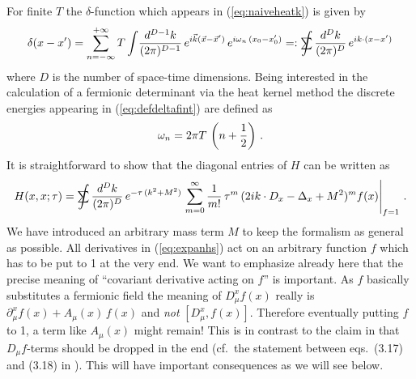 \documentclass[a4paper,showpacs,showkeys,prd,nofootinbib]{revtex4}
\newcommand{\sumint}{\hbox{$\sum$}\!\!\!\!\!\!\!\int }
\begin{document}
For finite $T$ the $\delta$-function which appears in (\ref{eq:naiveheatk}) is given
by
\begin{equation}
  \label{eq:defdeltafint}
\delta(x-x') = \sum\limits_{n = -\infty}^{+\infty} 
T \int\! {d^{D-1}k \over (2 \pi)^{D-1}} \, e^{i \vec k (\vec x - \vec x')}
\, e^{i \omega_n \, (x_0 - x_0')} 
=: \sumint  {d^{D}k \over (2 \pi)^{D}} \, e^{i k \cdot (x - x')}
\end{equation}
where $D$ is the number of space-time dimensions.
Being interested in the calculation of a fermionic determinant via the heat kernel
method the discrete energies appearing in (\ref{eq:defdeltafint}) are defined as
\cite{Matsubara:1955ws,Das:1997gg}
\begin{equation}
  \label{eq:defenerg}
\omega_n = 2 \pi T \,\left( n + {1 \over 2} \right)   \,.
\end{equation}
It is straightforward to show that the diagonal entries of $H$ can be written as
\cite{Nepomechie:1985wt}
\begin{equation}
  \label{eq:expanhs}
H(x,x;\tau) = \sumint {d^{D}k \over (2 \pi)^{D}} \, e^{-\tau \, (k^2+M^2)}
\left. 
\sum\limits_{m=0}^\infty {1 \over m!} \, \tau^m \, (2 i k \cdot D_x - \Delta_x + M^2)^m
f(x) \right\vert_{f = 1}  \,.
\end{equation}
We have introduced an arbitrary mass term $M$ to keep the formalism as general as
possible. All derivatives in (\ref{eq:expanhs}) act on an arbitrary function $f$ which
has to be put to 1 at the very end. We want to emphasize already here that the precise
meaning of ``covariant derivative acting on $f$'' is important. As $f$ basically
substitutes a fermionic field the meaning of $D^x_\mu f(x)$ really is
$\partial_\mu^x f(x)+ A_\mu(x)\,f(x)$ and {\em not} $[D_\mu^x,f(x)]$. Therefore
eventually putting $f$ to 1, a term like $A_\mu(x)$ might remain! This is in contrast
to the claim in \cite{Boschi-Filho:1992ah} that $D_\mu f$-terms should be dropped in the
end (cf.~the statement between eqs.~(3.17) and (3.18) in \cite{Boschi-Filho:1992ah}). This will
have important consequences as we will see below.
\end{document}
